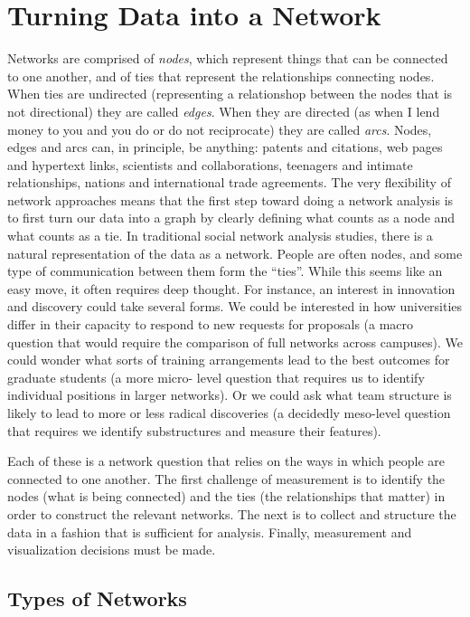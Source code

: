 \documentclass[]{krantz}
\begin{document}
\section{Turning Data into a Network}\label{turning-data-into-a-network}

Networks are comprised of \emph{nodes}, which represent things that can
be connected to one another, and of ties that represent the
relationships connecting nodes. When ties are undirected (representing a
relationshop between the nodes that is not directional) they are called
\emph{edges}. When they are directed (as when I lend money to you and
you do or do not reciprocate) they are called \emph{arcs}. Nodes, edges
and arcs can, in principle, be anything: patents and citations, web
pages and hypertext links, scientists and collaborations, teenagers and
intimate relationships, nations and international trade agreements. The
very flexibility of network approaches means that the first step toward
doing a network analysis is to first turn our data into a graph by
clearly defining what counts as a node and what counts as a tie. In
traditional social network analysis studies, there is a natural
representation of the data as a network. People are often nodes, and
some type of communication between them form the ``ties''. While this
seems like an easy move, it often requires deep thought. For instance,
an interest in innovation and discovery could take several forms. We
could be interested in how universities differ in their capacity to
respond to new requests for proposals (a macro question that would
require the comparison of full networks across campuses). We could
wonder what sorts of training arrangements lead to the best outcomes for
graduate students (a more micro- level question that requires us to
identify individual positions in larger networks). Or we could ask what
team structure is likely to lead to more or less radical discoveries (a
decidedly meso-level question that requires we identify substructures
and measure their features).

Each of these is a network question that relies on the ways in which
people are connected to one another. The first challenge of measurement
is to identify the nodes (what is being connected) and the ties (the
relationships that matter) in order to construct the relevant networks.
The next is to collect and structure the data in a fashion that is
sufficient for analysis. Finally, measurement and visualization
decisions must be made.

\subsection{Types of Networks}\label{types-of-networks}
\end{document}
